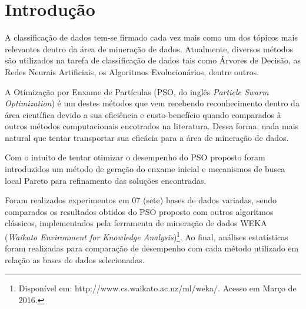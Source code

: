 \documentclass[
	12pt,				%
	openany,			%
	oneside,	
	a4paper,			%
	brazil,				%
	]{unimontes-ppgmsc-abntex2}
\let\oldtextual\textual        %
\renewcommand{\textual}{%
  \oldtextual%
  \pagenumbering{arabic} %
  \setcounter{page}{13}
}
\begin{document}
\listoffigures*
\clearpage

\listoftables*
\clearpage

\textual
\setlength{\headsep}{0.2in}

\chapter[Introdução]{Introdução}
\label{ch: introducao}

A classificação de dados tem-se firmado cada vez mais como um dos tópicos mais relevantes dentro da área de mineração de dados. Atualmente, diversos métodos são utilizados na tarefa de classificação de dados tais como Árvores de Decisão, as Redes Neurais Artificiais, os Algoritmos Evolucionários, dentre outros. 

A Otimização por Enxame de Partículas (PSO, do inglês {\em Particle Swarm Optimization}) é um destes métodos que vem recebendo reconhecimento dentro da área científica devido a sua eficiência e custo-benefício quando comparados à outros métodos computacionais encotrados na literatura. Dessa forma, nada mais natural que tentar transportar sua eficácia para a área de mineração de dados. 

Com o intuito de tentar otimizar o desempenho do PSO proposto foram introduzidos um método de geração do enxame inicial e mecanismos de busca local Pareto para refinamento das soluções encontradas.

Foram realizados experimentos em 07 (sete) bases de dados variadas, sendo comparados os resultados obtidos do PSO proposto com outros algoritmos clássicos, implementados pela ferramenta de mineração de dados WEKA (\textit{Waikato Environment for Knowledge Analysis})\footnote{Disponível em: http://www.cs.waikato.ac.nz/ml/weka/. Acesso em Março de 2016.}. Ao final, análises estatísticas foram realizadas para comparação de desempenho com cada método utilizado em relação as bases de dados selecionadas.
\end{document}
